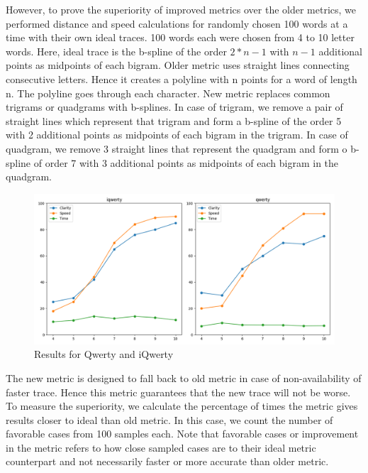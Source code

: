 \documentclass[MTech]{iitmdiss}
\begin{document}
However, to prove the superiority of improved metrics over the older metrics, we performed distance and speed calculations for randomly chosen 100 words at a time with their own ideal traces. 100 words each were chosen from 4 to 10 letter words. Here, ideal trace is the b-spline of the order $2*n-1$ with $n-1$ additional points as midpoints of each bigram. Older metric uses straight lines connecting consecutive letters. Hence it creates a polyline with n points for a word of length n. The polyline goes through each character. New metric replaces common trigrams or quadgrams with b-splines. In case of trigram, we remove a pair of straight lines which represent that trigram and form a b-spline of the order 5 with 2 additional points as midpoints of each bigram in the trigram. In case of quadgram, we remove 3 straight lines that represent the quadgram and form o b-spline of order 7 with 3 additional points as midpoints of each bigram in the quadgram. 


\begin{figure}[h!] 
	\centering
	\includegraphics[scale=0.5]{Images/result}
	\caption{Results for Qwerty and iQwerty}
	\label{fig:results}
\end{figure}


The new metric is designed to fall back to old metric in case of non-availability of faster trace. Hence this metric guarantees that the new trace will not be worse. To measure the superiority, we calculate the percentage of times the metric gives results closer to ideal than old metric. In this case, we count the number of favorable cases from 100 samples each. Note that favorable cases or improvement in the metric refers to how close sampled cases are to their ideal metric counterpart and not necessarily faster or more accurate than older metric.
\end{document}

